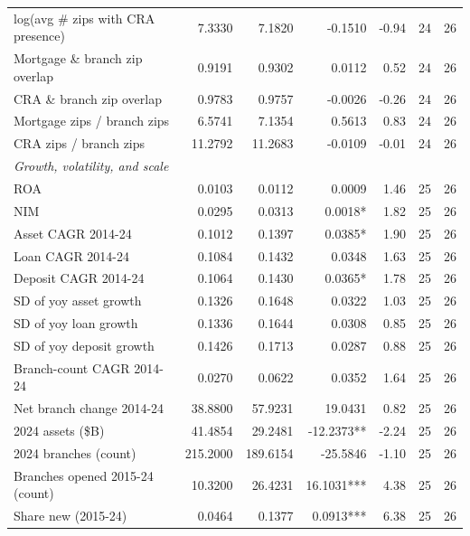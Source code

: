 \begin{tabular}{lrrrrrr}
log(avg \# zips with CRA presence) & 7.3330 & 7.1820 & -0.1510 & -0.94 & 24 & 26 \\
Mortgage \& branch zip overlap & 0.9191 & 0.9302 & 0.0112 & 0.52 & 24 & 26 \\
CRA \& branch zip overlap & 0.9783 & 0.9757 & -0.0026 & -0.26 & 24 & 26 \\
Mortgage zips / branch zips & 6.5741 & 7.1354 & 0.5613 & 0.83 & 24 & 26 \\
CRA zips / branch zips & 11.2792 & 11.2683 & -0.0109 & -0.01 & 24 & 26 \\
\midrule
\multicolumn{7}{l}{\emph{Growth, volatility, and scale}} \\
\midrule
ROA & 0.0103 & 0.0112 & 0.0009 & 1.46 & 25 & 26 \\
NIM & 0.0295 & 0.0313 & 0.0018* & 1.82 & 25 & 26 \\
Asset CAGR 2014-24 & 0.1012 & 0.1397 & 0.0385* & 1.90 & 25 & 26 \\
Loan CAGR 2014-24 & 0.1084 & 0.1432 & 0.0348 & 1.63 & 25 & 26 \\
Deposit CAGR 2014-24 & 0.1064 & 0.1430 & 0.0365* & 1.78 & 25 & 26 \\
SD of yoy asset growth & 0.1326 & 0.1648 & 0.0322 & 1.03 & 25 & 26 \\
SD of yoy loan growth & 0.1336 & 0.1644 & 0.0308 & 0.85 & 25 & 26 \\
SD of yoy deposit growth & 0.1426 & 0.1713 & 0.0287 & 0.88 & 25 & 26 \\
Branch-count CAGR 2014-24 & 0.0270 & 0.0622 & 0.0352 & 1.64 & 25 & 26 \\
Net branch change 2014-24 & 38.8800 & 57.9231 & 19.0431 & 0.82 & 25 & 26 \\
2024 assets (\$B) & 41.4854 & 29.2481 & -12.2373** & -2.24 & 25 & 26 \\
2024 branches (count) & 215.2000 & 189.6154 & -25.5846 & -1.10 & 25 & 26 \\
Branches opened 2015-24 (count) & 10.3200 & 26.4231 & 16.1031*** & 4.38 & 25 & 26 \\
Share new (2015-24) & 0.0464 & 0.1377 & 0.0913*** & 6.38 & 25 & 26 \\
\bottomrule
\end{tabular}

